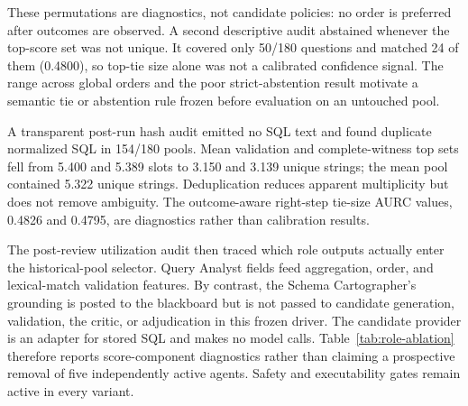 \documentclass[information,article,submit,moreauthors]{Definitions/mdpi}
\begin{document}
These permutations are diagnostics, not candidate policies: no order is preferred after outcomes are observed. A second descriptive audit abstained whenever the top-score set was not unique. It covered only 50/180 questions and matched 24 of them (0.4800), so top-tie size alone was not a calibrated confidence signal. The range across global orders and the poor strict-abstention result motivate a semantic tie or abstention rule frozen before evaluation on an untouched pool.

A transparent post-run hash audit emitted no SQL text and found duplicate normalized SQL in 154/180 pools. Mean validation and complete-witness top sets fell from 5.400 and 5.389 slots to 3.150 and 3.139 unique strings; the mean pool contained 5.322 unique strings. Deduplication reduces apparent multiplicity but does not remove ambiguity. The outcome-aware right-step tie-size AURC values, 0.4826 and 0.4795, are diagnostics rather than calibration results.

\begin{table}[htbp]
\caption{Exact global candidate-order sensitivity under the unified shape-and-denotation evaluator. All 40,320 orders are outcome-aware diagnostics; original and reverse are two members of that enumeration.}
\label{tab:sensitivity}
\centering
\small
{}
\end{table}

The post-review utilization audit then traced which role outputs actually enter the historical-pool selector. Query Analyst fields feed aggregation, order, and lexical-match validation features. By contrast, the Schema Cartographer's grounding is posted to the blackboard but is not passed to candidate generation, validation, the critic, or adjudication in this frozen driver. The candidate provider is an adapter for stored SQL and makes no model calls. Table~\ref{tab:role-ablation} therefore reports score-component diagnostics rather than claiming a prospective removal of five independently active agents. Safety and executability gates remain active in every variant.
\end{document}
